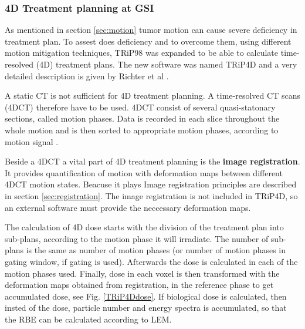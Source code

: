 \documentclass[type=dr, dr=rernat, accentcolor=tud7b,colorbacktitle, bigchapter, openright, twoside, 12pt ]{tudthesis}
\begin{document}
\subsubsection{4D Treatment planning at GSI}

As mentioned in section \ref{sec:motion} tumor motion can cause severe deficiency in treatment plan. To assest does deficiency and to overcome them, using different motion mitigation techniques, 
TRiP98 was expanded to be able to calculate time-resolved (4D) treatment plans. The new software was named TRiP4D and a very detailed description is given by Richter et al \cite{Richter2013}.

A static CT is not sufficient for 4D treatment planning. A time-resolved CT scans (4DCT) therefore have to be used. 4DCT consist of several quasi-statonary sections, called motion phases. Data is
recorded in each slice throughout the whole motion and is then sorted to appropriate motion phases, according to motion signal \cite{Rietzel2005}.

Beside a 4DCT a vital part of 4D treatment planning is the \textbf{image registration}. It provides quantification of motion with deformation maps between different 4DCT motion states. Beacuse it plays
Image registration principles are described in section \ref{sec:registration}. The image registration is not included in TRiP4D, so an external software must provide the neccessary
deformation maps.

The calculation of 4D dose starts with the division of the treatment plan into sub-plans, according to the motion phase it will irradiate. The number of sub-plans is the same as number of motion phases (or number of motion phases
in gating window, if gating is used). Afterwards the dose is calculated in each of the motion phases used. Finally, dose in each voxel is then transformed with the deformation maps
obtained from registration, in the reference phase to get accumulated dose, see Fig. \ref{TRiP4Ddose}. If biological dose is calculated, then insted of the dose, particle number and energy spectra is accumulated, 
so that the RBE can be calculated according to LEM.
\end{document}
